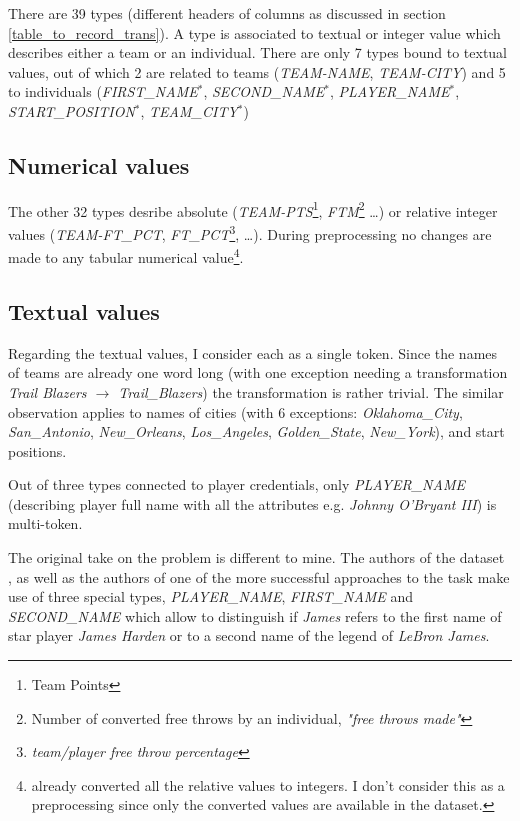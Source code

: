There are 39 types (different headers of columns as discussed in section \ref{table_to_record_trans}). A type is associated to textual or integer value which describes either a team or an individual. There are only 7 types bound to textual values, out of which 2 are related to teams (\emph{TEAM-NAME}, \emph{TEAM-CITY}) and 5 to individuals (\emph{FIRST\_NA\-ME}$^*$, \emph{SE\-COND\_NAME}$^*$, \emph{PLAYER\_NAME}$^*$, \emph{START\_POSITION}$^*$, \emph{TEAM\_CI\-TY}$^*$)

\subsection{Numerical values}

The other 32 types desribe absolute (\emph{TEAM-PTS}\footnote{Team Points}, \emph{FTM}\footnote{Number of converted free throws by an individual, \emph{"free throws made"}} \dots) or relative integer values (\emph{TEAM-FT\_PCT}, \emph{FT\_PCT}\footnote{\emph{team/player free throw percentage}}, \dots). During preprocessing no changes are made to any tabular numerical value\footnote{\citep{wiseman2017} already converted all the relative values to integers. I don't consider this as a preprocessing since only the converted values are available in the dataset.}.

\subsection{Textual values} \label{trans_p_nms}

Regarding the textual values, I consider each as a single token. Since the names of teams are already one word long (with one exception needing a transformation \emph{Trail Blazers $\rightarrow$ Trail\_Blazers}) the transformation is rather trivial. The similar observation applies to names of cities (with 6 exceptions: \emph{Oklahoma\_City}, \emph{San\_Antonio}, \emph{New\_Orleans}, \emph{Los\_Angeles}, \emph{Golden\_State}, \emph{New\_York}), and start positions.

Out of three types connected to player credentials, only \emph{PLAYER\_NAME} (describing player full name with all the attributes e.g. \emph{Johnny O'Bryant III}) is multi-token.

The original take on the problem is different to mine. The authors of the dataset \citep{wiseman2017}, as well as the authors of one of the more successful approaches to the task \citep{puduppully2019datatotext} make use of three special types, \emph{PLAYER\_NAME}, \emph{FIRST\_NAME} and \emph{SECOND\_NAME} which allow to distinguish if \emph{James} refers to the first name of star player \emph{James Harden} or to a second name of the legend of \emph{LeBron James}.

